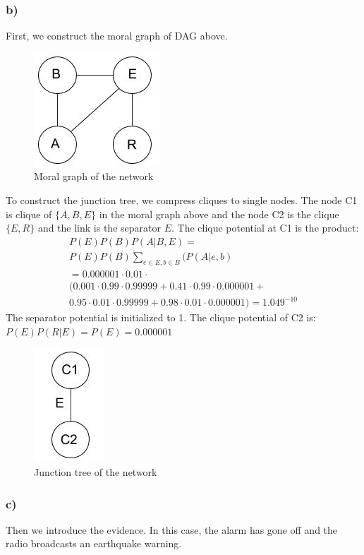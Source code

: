 \documentclass[11pt,a4paper]{article}
\begin{document}
\subsubsection*{b)}
First, we construct the moral graph of DAG above.
	\begin{figure}[h]
		\caption{Moral graph of the network}
		\centering
		\includegraphics[width=.3\textwidth]{MORAL}
	\end{figure}
\newpage
To construct the junction tree, we compress cliques to single nodes. The node C1 is clique of $\{A, B, E\}$ in the moral graph above and the node C2 is the clique $\{E, R\}$ and the link is the separator $E$. The clique potential at C1 is the product:
\begin{equation*}
\begin{split}
P(E)P(B)P(A|B,E)=\\
P(E)P(B)\sum_{e \in E, b \in B}(P(A|e, b)\\
=0.000001\cdot 0.01\cdot\\
(0.001\cdot0.99\cdot0.99999+0.41\cdot0.99\cdot0.000001+\\
0.95\cdot0.01\cdot0.99999+0.98\cdot0.01\cdot0.000001) = 1.049^{-10}
\end{split}
\end{equation*}
The separator potential is initialized to 1. The clique potential of C2 is: $P(E)P(R|E)=P(E)=0.000001$
\begin{figure}[h]
	\caption{Junction tree of the network}
	\centering
	\includegraphics[width=.2\textwidth]{junction}
\end{figure}
\subsubsection*{c)}
Then we introduce the evidence. In this case, the alarm has gone off and the radio broadcasts an earthquake warning.
\end{document}
